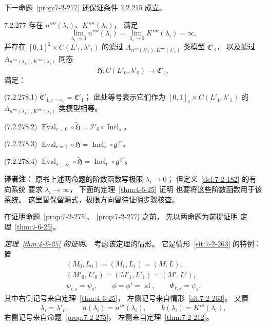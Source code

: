 下一命题~\ref{prop:7-2-277}
还保证条件 7.2.215 成立。
\begin{proposition}{7.2.277}\label{prop:7-2-277}
存在 $n''''(\lambda_i)$、$K''''(\lambda_i)$，
满足
\[
\lim_{\lambda_i\to0}n''''(\lambda_i)
=\lim_{\lambda_i\to0}K''''(\lambda_i)=\infty,
\]
并存在
$[0,1]^2\times C(L'_1,\lambda'_1)$
的滤过
$A_{n''''(\lambda'_1),K''''(\lambda'_1)}$
类模型 $\widetilde{\mathfrak C}'_1$，
以及滤过
$A_{n''''(\lambda_1),K''''(\lambda_1)}$
同态
\[
\widetilde{\mathfrak H}\colon
C(L'_0,\lambda'_0)\longrightarrow
\widetilde{\mathfrak C}'_1,
\]
满足：

\par\noindent\textup{(7.2.278.1)}
$\widetilde{\mathfrak C}'_{1,r=r_0}
=\mathfrak C'_1$；
此处等号表示它们作为
$[0,1]_s\times C(L'_1,\lambda'_1)$
的 $A_{n''''(\lambda_1),K''''(\lambda_1)}$
类模型相等。

\par\noindent\textup{(7.2.278.2)}
$\operatorname{Eval}_{r=0}\circ\widetilde{\mathfrak H}
=\mathcal I'_0\circ\operatorname{Incl}_s$。

\par\noindent\textup{(7.2.278.3)}
$\operatorname{Eval}_{r=1}\circ\widetilde{\mathfrak H}
=\operatorname{Incl}_s\circ\mathfrak g^{\phi'}$。

\par\noindent\textup{(7.2.278.4)}
$\operatorname{Eval}_{s=s_0}\circ\widetilde{\mathfrak H}
=\operatorname{Incl}_r\circ\mathfrak g^{\phi'}$。
\end{proposition}

\noindent\textbf{译者注：}
原书上述两命题的阶数函数写极限
$\lambda_i\to0$；
但定义~\ref{def:7-2-182} 的有向系统
要求 $\lambda_i\to\infty$，
下面的定理~\ref{thm:4-6-25} 证明
也要将这些阶数函数用于该系统。
这里暂保留源式，极限方向留待证明步骤核查。

在证明命题~\ref{prop:7-2-275}、
\ref{prop:7-2-277} 之前，
先以两命题为前提证明
定理~\ref{thm:4-6-25}。

\par\noindent\textit{定理~\ref{thm:4-6-25} 的证明。}
考虑该定理的情形。
它是情形~\ref{sit:7-2-263} 的特例：
置
\[
\begin{gathered}
(M_0,L_0)=(M_1,L_1)=(M,L),\\
(M'_0,L'_0)=(M'_1,L'_1)=(M',L'),\\
\psi_{i,s}=\psi_s,\qquad
\phi=\phi'=\operatorname{id},\qquad
\Phi_{r,s}=\psi_s .
\end{gathered}
\]
其中右侧记号来自定理~\ref{thm:4-6-25}，
左侧记号来自情形~\ref{sit:7-2-263}。
又置
\[
\lambda_i=\lambda'_i,\qquad
\bar n(\lambda_i)=n'''(\lambda_i),\qquad
\bar k(\lambda_i)=K'''(\lambda_i),
\]
右侧记号来自命题~\ref{prop:7-2-275}，
左侧来自定理~\ref{thm:7-2-212}。

